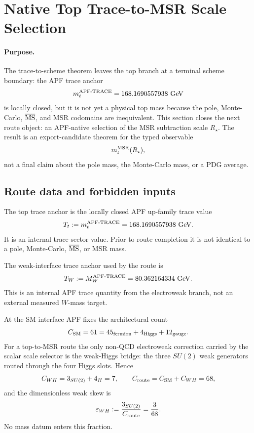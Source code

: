 \section{Native Top Trace-to-MSR Scale Selection}
\label{sec:top-msr-scale-selection-v37}

\paragraph{Purpose.}
The trace-to-scheme theorem leaves the top branch at a terminal scheme boundary: the APF trace anchor
\[
        m_t^{\rm APF\text{-}TRACE}=168.1690557938\ {\rm GeV}
\]
is locally closed, but it is not yet a physical top mass because the pole, Monte-Carlo, \(\overline{\rm MS}\), and MSR codomains are inequivalent.  This section closes the next route object: an APF-native selection of the MSR subtraction scale \(R_\star\).  The result is an export-candidate theorem for the typed observable
\[
        m_t^{\rm MSR}(R_\star),
\]
not a final claim about the pole mass, the Monte-Carlo mass, or a PDG average.

\subsection{Route data and forbidden inputs}

\begin{definition}
The top trace anchor is the locally closed APF up-family trace value
\[
        T_t:=m_t^{\rm APF\text{-}TRACE}=168.1690557938\ {\rm GeV}.
\]
It is an internal trace-sector value.  Prior to route completion it is not identical to a pole, Monte-Carlo, \(\overline{\rm MS}\), or MSR mass.
\end{definition}

\begin{definition}
The weak-interface trace anchor used by the route is
\[
        T_W:=M_W^{\rm APF\text{-}TRACE}=80.362164334\ {\rm GeV}.
\]
This is an internal APF trace quantity from the electroweak branch, not an external measured \(W\)-mass target.
\end{definition}

\begin{definition}
At the SM interface APF fixes the architectural count
\[
        C_{\rm SM}=61=45_{\rm fermion}+4_{\rm Higgs}+12_{\rm gauge}.
\]
For a top-to-MSR route the only non-QCD electroweak correction carried by the scalar scale selector is the weak-Higgs bridge: the three \(SU(2)\) weak generators routed through the four Higgs slots.  Hence
\[
        C_{WH}=3_{SU(2)}+4_H=7,
        \qquad
        C_{\rm route}=C_{\rm SM}+C_{WH}=68,
\]
and the dimensionless weak skew is
\[
        \varepsilon_{WH}:={3_{SU(2)}\over C_{\rm route}}={3\over 68}.
\]
No mass datum enters this fraction.
\end{definition}


